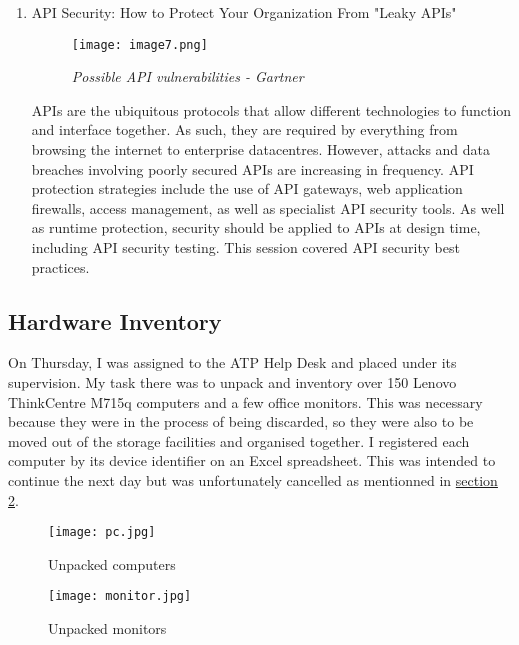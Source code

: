 \begin{enumerate}
    \newpage

    \item \color{dgreen} API Security: How to Protect Your Organization From
          "Leaky APIs"

    \begin{figure}[H]
        \centering
            \texttt{[image: image7.png]}
            \caption*{\textit{Possible API vulnerabilities - Gartner}}
    \end{figure}

    \color{black} APIs are the ubiquitous protocols that allow different
    technologies to function and interface together. As such, they are required
    by everything from browsing the internet to enterprise datacentres. However,
    attacks and data breaches involving poorly secured APIs are increasing in
    frequency. API protection strategies include the use of API gateways, web
    application firewalls, access management, as well as specialist API security
    tools. As well as runtime protection, security should be applied to APIs at
    design time, including API security testing. This session covered API
    security best practices.
\end{enumerate}

\subsection{Hardware Inventory}

On Thursday, I was assigned to the ATP Help Desk and placed under its
supervision. My task there was to unpack and inventory over 150 Lenovo
ThinkCentre M715q computers and a few office monitors. This was necessary
because they were in the process of being discarded, so they were also to be
moved out of the storage facilities and organised together.  I registered each
computer by its device identifier on an Excel spreadsheet.\cite{pc_excel} This
was intended to continue the next day but was unfortunately cancelled as
mentionned in \hyperlink{section.2}{section 2}.

\begin{figure}[H]
    \centering
    \begin{minipage}[b]{0.49\textwidth}
      \texttt{[image: pc.jpg]}
      \caption*{Unpacked computers}
    \end{minipage}
    \hfill
    \begin{minipage}[b]{0.49\textwidth}
      \texttt{[image: monitor.jpg]}
      \caption*{Unpacked monitors}
    \end{minipage}
\end{figure}

